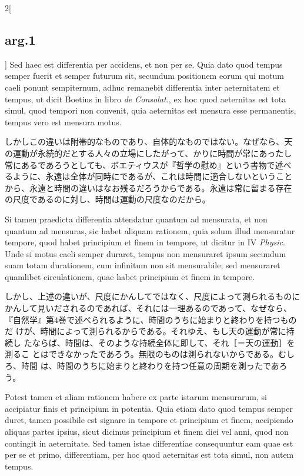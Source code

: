\documentclass[paper=a4paper,fontsize=10pt,jafontsize=9pt,titlepage]{jlreq}
\begin{document}
\begin{paracol}{2}[\subsection{arg.1}]
Sed haec est differentia per accidens, et non per se. Quia dato quod
tempus semper fuerit et semper futurum sit, secundum positionem eorum
qui motum caeli ponunt sempiternum, adhuc remanebit differentia inter
aeternitatem et tempus, ut dicit Boetius in libro {\itshape de Consolat.}, ex
hoc quod aeternitas est tota simul, quod tempori non convenit, quia
aeternitas est mensura esse permanentis, tempus vero est mensura motus.

\switchcolumn

しかしこの違いは附帯的なものであり、自体的なものではない。なぜなら、天
の運動が永続的だとする人々の立場にしたがって、かりに時間が常にあったし
常にあるであろうとしても、ボエティウスが『哲学の慰め』という書物で述べ
るように、永遠は全体が同時にであるが、これは時間に適合しないということ
から、永遠と時間の違いはなお残るだろうからである。永遠は常に留まる存在
の尺度であるのに対し、時間は運動の尺度なのだから。

\switchcolumn*

Si tamen praedicta differentia attendatur quantum ad mensurata, et non
quantum ad mensuras, sic habet aliquam rationem, quia solum illud
mensuratur tempore, quod habet principium et finem in tempore, ut
dicitur in IV {\itshape Physic}. Unde si motus caeli semper duraret, tempus
non mensuraret ipsum secundum suam totam durationem, cum infinitum non
sit mensurabile; sed mensuraret quamlibet circulationem, quae habet
principium et finem in tempore.

\switchcolumn

しかし、上述の違いが、尺度にかんしてではなく、尺度によって測られるものに
かんして見いだされるのであれば、それには一理あるのであって、なぜなら、
『自然学』第4巻で述べられるように、時間のうちに始まりと終わりを持つものだ
けが、時間によって測られるからである。それゆえ、もし天の運動が常に持続し
たならば、時間は、そのような持続全体に即して、それ［＝天の運動］を測るこ
とはできなかったであろう。無限のものは測られないからである。むしろ、時間
は、時間のうちに始まりと終わりを持つ任意の周期を測ったであろう。

\switchcolumn*

Potest tamen et aliam rationem habere ex parte istarum mensurarum, si
accipiatur finis et principium in potentia. Quia etiam dato quod tempus
semper duret, tamen possibile est signare in tempore et principium et
finem, accipiendo aliquas partes ipsius, sicut dicimus principium et
finem diei vel anni, quod non contingit in aeternitate. Sed tamen istae
differentiae consequuntur eam quae est per se et primo, differentiam,
per hoc quod aeternitas est tota simul, non autem tempus.


\end{paracol}
\end{document}
